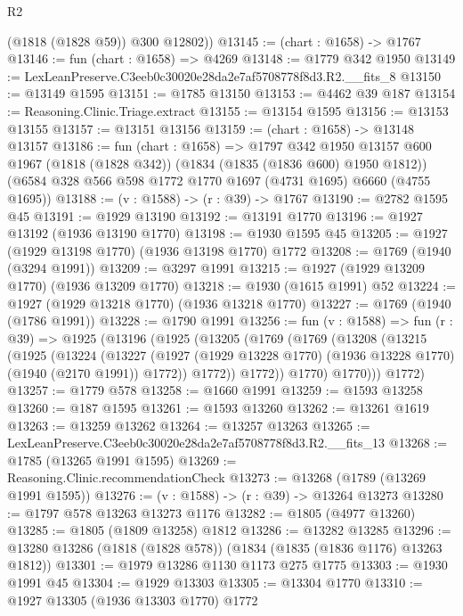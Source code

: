 \begin{lexlean}{R2}
\begin{coremodule}
        (@1818 (@1828 @59))
        @300
        @12802))
@13145 := (chart : @1658) -> @1767
@13146 := fun (chart : @1658) => @4269
@13148 := @1779 @342 @1950
@13149 := LexLeanPreserve.C3eeb0c30020e28da2e7af5708778f8d3.R2.__fits_8
@13150 := @13149 @1595
@13151 := @1785 @13150
@13153 := @4462 @39 @187
@13154 := Reasoning.Clinic.Triage.extract
@13155 := @13154 @1595
@13156 := @13153 @13155
@13157 := @13151 @13156
@13159 := (chart : @1658) -> @13148 @13157
@13186 := fun (chart : @1658) =>
  @1797
    @342
    @1950
    @13157
    @600
    @1967
    (@1818 (@1828 @342))
    (@1834 (@1835 (@1836 @600) @1950 @1812))
    (@6584 @328 @566 @598 @1772 @1770 @1697 (@4731 @1695) @6660 (@4755 @1695))
@13188 := (v : @1588) -> (r : @39) -> @1767
@13190 := @2782 @1595 @45
@13191 := @1929 @13190
@13192 := @13191 @1770
@13196 := @1927 @13192 (@1936 @13190 @1770)
@13198 := @1930 @1595 @45
@13205 := @1927 (@1929 @13198 @1770) (@1936 @13198 @1770) @1772
@13208 := @1769 (@1940 (@3294 @1991))
@13209 := @3297 @1991
@13215 := @1927 (@1929 @13209 @1770) (@1936 @13209 @1770)
@13218 := @1930 (@1615 @1991) @52
@13224 := @1927 (@1929 @13218 @1770) (@1936 @13218 @1770)
@13227 := @1769 (@1940 (@1786 @1991))
@13228 := @1790 @1991
@13256 := fun (v : @1588) =>
  fun (r : @39) =>
  @1925
    (@13196
      (@1925
        (@13205
          (@1769
            (@1769
              (@13208
                (@13215
                  (@1925
                    (@13224
                      (@13227
                        (@1927
                          (@1929 @13228 @1770)
                          (@1936 @13228 @1770)
                          (@1940 (@2170 @1991))
                          @1772))
                      @1772))
                  @1772))
              @1770)
            @1770)))
      @1772)
@13257 := @1779 @578
@13258 := @1660 @1991
@13259 := @1593 @13258
@13260 := @187 @1595
@13261 := @1593 @13260
@13262 := @13261 @1619
@13263 := @13259 @13262
@13264 := @13257 @13263
@13265 := LexLeanPreserve.C3eeb0c30020e28da2e7af5708778f8d3.R2.__fits_13
@13268 := @1785 (@13265 @1991 @1595)
@13269 := Reasoning.Clinic.recommendationCheck
@13273 := @13268 (@1789 (@13269 @1991 @1595))
@13276 := (v : @1588) -> (r : @39) -> @13264 @13273
@13280 := @1797 @578 @13263 @13273 @1176
@13282 := @1805 (@4977 @13260)
@13285 := @1805 (@1809 @13258) @1812
@13286 := @13282 @13285
@13296 := @13280 @13286 (@1818 (@1828 @578)) (@1834 (@1835 (@1836 @1176) @13263 @1812))
@13301 := @1979 @13286 @1130 @1173 @275 @1775
@13303 := @1930 @1991 @45
@13304 := @1929 @13303
@13305 := @13304 @1770
@13310 := @1927 @13305 (@1936 @13303 @1770) @1772

\end{coremodule}
\end{lexlean}

